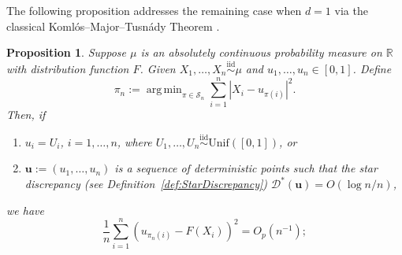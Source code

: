 \documentclass[11pt]{article}
\newtheorem{prop}[thm]{Proposition}
\DeclareMathOperator*{\argmin}{arg\,min}
\newcommand{\bs}[1]{\boldsymbol{#1}}
\begin{document}
The following proposition addresses the remaining case when $d = 1$ via the classical Koml\'{o}s--Major--Tusn\'{a}dy Theorem \cite{komlos1975approximation}. 

\begin{prop}\label{prop:1DKMTMatching}
    Suppose $\mu$ is an absolutely continuous probability measure on $\mathbb{R}$ with distribution function $F$. Given $X_1, \ldots, X_n \stackrel{\mathrm{iid}}{\sim} \mu$ and $u_1, \ldots, u_n \in [0, 1]$. Define  
    \[
    \pi_n := \argmin_{\pi \in \mathcal{S}_n} \sum_{i = 1}^n |X_{i} - u_{\pi(i)}|^2.
    \]
    Then, if
    \begin{enumerate}[label = (\roman*), ref=\theprop(\roman*)]
        \item\label{prop:1DKMTMatching_random}  $u_i = U_i$, $i = 1, \ldots, n$, where $U_1, \ldots, U_n \stackrel{\mathrm{iid}}{\sim} \mathrm{Unif}([0, 1])$, or
        \item\label{prop:1DKMTMatching_deterministic}  $\bs{u}:=(u_1, \ldots, u_n)$ is a sequence of deterministic points such that the star discrepancy (see Definition~\ref{def:StarDiscrepancy}) $\mathcal{D}^*(\bs{u}) = O(\log n / n)$,
    \end{enumerate}
     we have 
    \[
    \frac{1}{n}\sum_{i = 1}^n (u_{\pi_n(i)} - F(X_i))^2 = O_p(n^{-1});
    \]


\end{prop}
\end{document}
